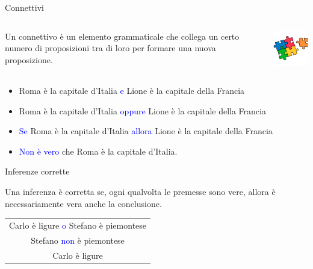 \documentclass[aspectratio=169,10pt]{beamer}
\newcommand{\conn}[1]{\textcolor{blue}{#1}}
\newenvironment{inference}{\begin{tabular}{c}}{\end{tabular}}
\begin{document}
\begin{frame}{Connettivi}
    \begin{columns}
            \begin{definition}[Connettivo]
                Un \alert{connettivo} è un elemento grammaticale che collega un certo numero di proposizioni tra di loro per formare una nuova proposizione.
            \end{definition}
            \begin{center}
                \includegraphics[width=3cm,keepaspectratio]{puzzle.png}
            \end{center}
    \end{columns}
    \begin{example}
        \begin{itemize}
            \item Roma è la capitale d'Italia \conn{e} Lione è la capitale della Francia
            \item Roma è la capitale d'Italia \conn{oppure} Lione è la capitale della Francia
            \item \conn{Se} Roma è la capitale d'Italia \conn{allora} Lione è la capitale della Francia
            \item \conn{Non è vero} che Roma è la capitale d'Italia.
        \end{itemize}
    \end{example}
\end{frame}


\begin{frame}{Inferenze corrette}
	\begin{definition}
		Una inferenza è corretta se, ogni qualvolta le premesse sono vere, allora è necessariamente vera anche la conclusione.
  	\end{definition}
    \begin{example}
    \begin{center}
        \begin{inference}
        Carlo è ligure \conn{o} Stefano è piemontese\\
        Stefano \conn{non} è piemontese\\
        \hline
        Carlo è ligure
    \end{inference}
    \end{center}
    \end{example}
\end{frame}
\end{document}
